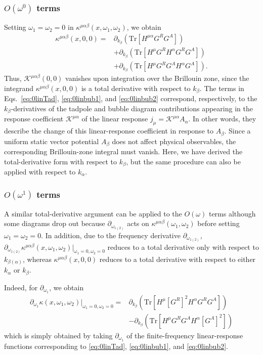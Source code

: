 \documentclass[twocolumn,superscriptaddress]{revtex4-1}
\begin{document}
\subsubsection{$O(\omega^0)$ terms}
Setting $\omega_1=\omega_2=0$ in $\kappa^{\mu\alpha\beta}(x,\omega_1,\omega_2)$, we obtain 
\begin{align}
  \kappa^{\mu\alpha\beta} (x,0,0)
  =& \partial_{k_\beta} (\mathrm{Tr}[H^{\mu\alpha}G^R G^A]) \label{eq:0linTad} \\
  &+\partial_{k_\beta} (\mathrm{Tr}[H^{\mu}G^R H^{\alpha} G^R G^A]) \label{eq:0linbub1} \\
  &+\partial_{k_\beta} (\mathrm{Tr}[H^{\mu}G^R G^A H^{\alpha} G^A]). \label{eq:0linbub2}
\end{align}
Thus, $\mathcal{K}^{\mu\alpha\beta}(0,0)$ vanishes upon integration over the Brillouin zone, since the integrand $\kappa^{\mu\alpha\beta}(x,0,0)$ is a total derivative with respect to $k_\beta$.
The terms in Eqs.~\eqref{eq:0linTad}, \eqref{eq:0linbub1}, and \eqref{eq:0linbub2} correspond, respectively, to the $k_\beta$-derivatives of the tadpole and bubble diagram contributions appearing in the response coefficient $\mathcal{K}^{\mu\alpha}$ of the linear response $j_\mu=\mathcal{K}^{\mu\alpha}A_\alpha$.
In other words, they describe the change of this linear-response coefficient in response to $A_\beta$. 
Since a uniform static vector potential $A_\beta$ does not affect physical observables, the corresponding Brillouin-zone integral must vanish. 
Here, we have derived the total-derivative form with respect to $k_\beta$, but the same procedure can also be applied with respect to $k_\alpha$.

\subsubsection{$O(\omega^1)$ terms}
A similar total-derivative argument can be applied to the $O(\omega)$ terms although some diagrams drop out because $\partial_{\omega_{1(2)}}$ acts on $\kappa^{\mu\alpha\beta}(\omega_1,\omega_2)$ before setting $\omega_1=\omega_2=0$.
In addition, due to the frequency derivative $\partial_{\omega_{1(2)}}$, $\partial_{\omega_{1(2)}}\kappa^{\mu\alpha\beta} (x,\omega_1,\omega_2)|_{\omega_1=0,\omega_2=0}$ reduces to a total derivative only with respect to $k_{\beta(\alpha)}$, whereas $\kappa^{\mu\alpha\beta} (x,0,0)$ reduces to a total derivative with respect to either $k_\alpha$ or $k_\beta$.

Indeed, for $\partial_{\omega_1}$, we obtain
\begin{align}
  \partial_{\omega_1}\kappa (x,\omega_1,\omega_2)|_{\omega_1=0,\omega_2=0}
  =&\partial_{k_\beta} (\mathrm{Tr}[H^{\mu}[G^R]^2 H^{\alpha} G^R G^A]) \label{eq:1linbub1} \\
  &-\partial_{k_\beta} (\mathrm{Tr}[H^{\mu}G^R G^A H^{\alpha} [G^A]^2]) \label{eq:1linbub2}
\end{align}
which is simply obtained by taking $\partial_{\omega_1}$ of the finite-frequency linear-response functions corresponding to \eqref{eq:0linTad}, \eqref{eq:0linbub1}, and \eqref{eq:0linbub2}.
\end{document}
